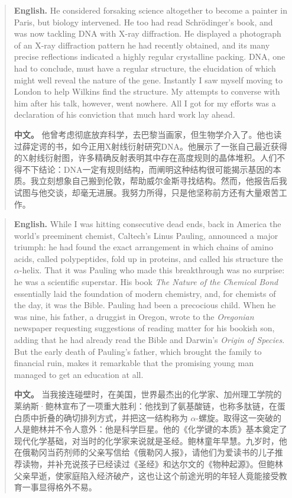 \begin{quote}
\noindent\textbf{English.} He considered forsaking science altogether to become a painter in Paris, but biology intervened. He too had read Schrödinger's book, and was now tackling DNA with X-ray diffraction. He displayed a photograph of an X-ray diffraction pattern he had recently obtained, and its many precise reflections indicated a highly regular crystalline packing. DNA, one had to conclude, must have a regular structure, the elucidation of which might well reveal the nature of the gene. Instantly I saw myself moving to London to help Wilkins find the structure. My attempts to converse with him after his talk, however, went nowhere. All I got for my efforts was a declaration of his conviction that much hard work lay ahead.

\smallskip
\noindent\textbf{中文。} 他曾考虑彻底放弃科学，去巴黎当画家，但生物学介入了。他也读过薛定谔的书，如今正用X射线衍射研究DNA。他展示了一张自己最近获得的X射线衍射图，许多精确反射表明其中存在高度规则的晶体堆积。人们不得不下结论：DNA一定有规则结构，而阐明这种结构很可能揭示基因的本质。我立刻想象自己搬到伦敦，帮助威尔金斯寻找结构。然而，他报告后我试图与他交谈，却毫无进展。我努力所得，只是他坚称前方还有大量艰苦工作。
\end{quote}

\begin{quote}
\noindent\textbf{English.} While I was hitting consecutive dead ends, back in America the world's preeminent chemist, Caltech's Linus Pauling, announced a major triumph: he had found the exact arrangement in which chains of amino acids, called polypeptides, fold up in proteins, and called his structure the \(\alpha\)-helix. That it was Pauling who made this breakthrough was no surprise: he was a scientific superstar. His book \emph{The Nature of the Chemical Bond} essentially laid the foundation of modern chemistry, and, for chemists of the day, it was the Bible. Pauling had been a precocious child. When he was nine, his father, a druggist in Oregon, wrote to the \emph{Oregonian} newspaper requesting suggestions of reading matter for his bookish son, adding that he had already read the Bible and Darwin's \emph{Origin of Species}. But the early death of Pauling's father, which brought the family to financial ruin, makes it remarkable that the promising young man managed to get an education at all.

\smallskip
\noindent\textbf{中文。} 当我接连碰壁时，在美国，世界最杰出的化学家、加州理工学院的莱纳斯·鲍林宣布了一项重大胜利：他找到了氨基酸链，也称多肽链，在蛋白质中折叠的确切排列方式，并把这一结构称为 \(\alpha\)-螺旋。取得这一突破的人是鲍林并不令人意外：他是科学巨星。他的《化学键的本质》基本奠定了现代化学基础，对当时的化学家来说就是圣经。鲍林童年早慧。九岁时，他在俄勒冈当药剂师的父亲写信给《俄勒冈人报》，请他们为爱读书的儿子推荐读物，并补充说孩子已经读过《圣经》和达尔文的《物种起源》。但鲍林父亲早逝，使家庭陷入经济破产，这也让这个前途光明的年轻人竟能接受教育一事显得格外不易。
\end{quote}

